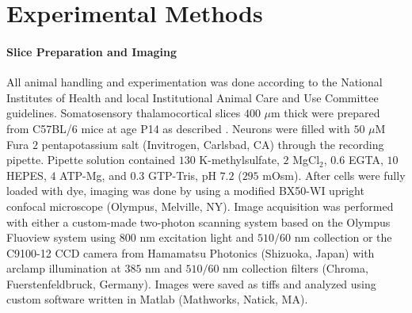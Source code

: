 \documentclass[12pt]{article}
\providecommand{\ve}[1]{\boldsymbol{#1}}
\providecommand{\ve}[1]{\boldsymbol{#1}}
\DeclareMathOperator*{\argmax}{argmax}
\newcommand{\thetn}{\ve{\theta}}
\newcommand{\p}{P_{\thetn}}
\newcommand{\Ca}{[\text{Ca}^{2+}]}
\begin{document}
%
%

\section*{Experimental Methods} \label{sec:exp_meth}

\paragraph{Slice Preparation and Imaging}

All animal handling and experimentation was done according to the National Institutes of Health and local Institutional Animal Care and Use Committee guidelines. Somatosensory thalamocortical slices $400$ $\mu$m thick were prepared from C57BL/6 mice at age P14 as described \cite{MacLeanYuste05}. Neurons were filled with $50$ $\mu$M Fura $2$ pentapotassium salt (Invitrogen, Carlsbad, CA) through the recording pipette. Pipette solution contained $130$ K-methylsulfate, $2$ MgCl$_2$, $0.6$ EGTA, $10$ HEPES, $4$ ATP-Mg, and $0.3$ GTP-Tris, pH $7.2$ ($295$ mOsm).  After cells were fully loaded with dye, imaging was done by using a modified BX50-WI upright confocal microscope (Olympus, Melville, NY).  Image acquisition was performed with either a custom-made two-photon scanning system based on the Olympus Fluoview system using $800$ nm excitation light and $510/60$ nm collection or the C9100-12 CCD camera from Hamamatsu Photonics (Shizuoka, Japan) with arclamp illumination at $385$ nm and $510/60$ nm collection filters (Chroma, Fuerstenfeldbruck, Germany).  Images were saved as tiffs and analyzed using custom software written in Matlab (Mathworks, Natick, MA).
\end{document}
